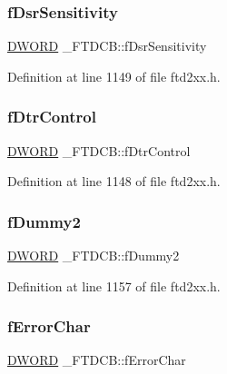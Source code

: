 \subsubsection{\texorpdfstring{f\+Dsr\+Sensitivity}{fDsrSensitivity}}
{\footnotesize\ttfamily \hyperlink{CatCaloProto40MHz_2inc_2WinTypes_8h_ad342ac907eb044443153a22f964bf0af}{D\+W\+O\+RD} \+\_\+\+F\+T\+D\+C\+B\+::f\+Dsr\+Sensitivity}



Definition at line 1149 of file ftd2xx.\+h.

\mbox{\label{struct__FTDCB_a770cbe04afe4551d954b460e15bc253e}} 
\subsubsection{\texorpdfstring{f\+Dtr\+Control}{fDtrControl}}
{\footnotesize\ttfamily \hyperlink{CatCaloProto40MHz_2inc_2WinTypes_8h_ad342ac907eb044443153a22f964bf0af}{D\+W\+O\+RD} \+\_\+\+F\+T\+D\+C\+B\+::f\+Dtr\+Control}



Definition at line 1148 of file ftd2xx.\+h.

\mbox{\label{struct__FTDCB_a14be508970e6bf12df194454e7d77583}} 
\subsubsection{\texorpdfstring{f\+Dummy2}{fDummy2}}
{\footnotesize\ttfamily \hyperlink{CatCaloProto40MHz_2inc_2WinTypes_8h_ad342ac907eb044443153a22f964bf0af}{D\+W\+O\+RD} \+\_\+\+F\+T\+D\+C\+B\+::f\+Dummy2}



Definition at line 1157 of file ftd2xx.\+h.

\mbox{\label{struct__FTDCB_a3d6289c590aebe652fbbdf4f173b16af}} 
\subsubsection{\texorpdfstring{f\+Error\+Char}{fErrorChar}}
{\footnotesize\ttfamily \hyperlink{CatCaloProto40MHz_2inc_2WinTypes_8h_ad342ac907eb044443153a22f964bf0af}{D\+W\+O\+RD} \+\_\+\+F\+T\+D\+C\+B\+::f\+Error\+Char}



